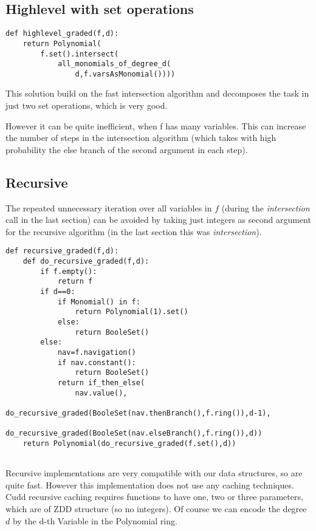 \documentclass[]{article}
\newcommand{\functionname}[1]{\textit{#1}\xspace}
\newcounter{thm}
\begin{document}
\subsection{Highlevel with set operations}
\begin{lstlisting}
def highlevel_graded(f,d):
    return Polynomial(
        f.set().intersect(
            all_monomials_of_degree_d(
                d,f.varsAsMonomial())))
\end{lstlisting}
This solution build on the fast intersection algorithm and decomposes the task in just two set operations, which is very good.

However it can be quite inefficient, when f has many variables.
This can increase the number of steps in the intersection algorithm (which takes with high probability the else branch of the second argument in each step).

\subsection{Recursive}
The repeated unnecessary iteration over all variables in $f$ (during the \functionname{intersection} call in the last section) can be avoided by taking just integers as second argument for the recursive algorithm (in the last section this was \functionname{intersection}).

\begin{lstlisting}
def recursive_graded(f,d):
    def do_recursive_graded(f,d):
        if f.empty():
            return f
        if d==0:
            if Monomial() in f:
                return Polynomial(1).set()
            else:
                return BooleSet()
        else:
            nav=f.navigation()
            if nav.constant():
                return BooleSet()
            return if_then_else(
                nav.value(),
                do_recursive_graded(BooleSet(nav.thenBranch(),f.ring()),d-1),
                do_recursive_graded(BooleSet(nav.elseBranch(),f.ring()),d))
    return Polynomial(do_recursive_graded(f.set(),d))
        
\end{lstlisting}
Recursive implementations are very compatible with our data structures, so are quite fast. However this implementation does not use any caching techniques. Cudd recursive caching requires functions to have one, two or three parameters, which are of ZDD structure (so no integers).
Of course we can encode the degree $d$ by the d-th Variable in the Polynomial
ring.
\end{document}
